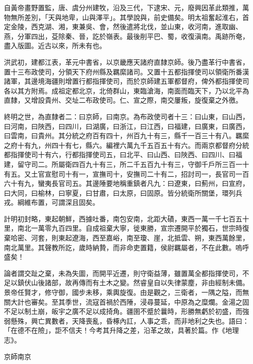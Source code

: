 
自黃帝畫野置監，唐、虞分州建牧，沿及三代，下逮宋、元，廢興因革此類推，萬物無所差別，「天與地卑，山與澤平」。其學說與，前史備矣。明太祖奮起淮右，首定金陵，西克湖、湘，東兼吳、會，然後遣將北伐，並山東，收河南，進取幽、燕，分軍四出，芟除秦、晉，訖於嶺表。最後削平巴、蜀，收復滇南。禹跡所奄，盡入版圖。近古以來，所未有也。

洪武初，建都江表，革元中書省，以京畿應天諸府直隸京師。後乃盡革行中書省，置十三布政使司，分領天下府州縣及羈縻諸司。又置十五都指揮使司以領衛所番漢諸軍，其邊境海疆則增置行都指揮使司，而於京師建五軍都督府，俾外都指揮使司各以其方附焉。成祖定都北京，北倚群山，東臨滄海，南面而臨天下，乃以北平為直隸，又增設貴州、交址二布政使司。仁、宣之際，南交屢叛，旋復棄之外徼。

終明之世，為直隸者二：曰京師，曰南京。為布政使司者十三：曰山東，曰山西，曰河南，曰陜西，曰四川，曰湖廣，曰浙江，曰江西，曰福建，曰廣東，曰廣西，曰雲南，曰貴州。其分統之府百有四十，州百九十有三，縣千一百三十有八。羈縻之府十有九，州四十有七，縣六。編裡六萬九千五百五十有六。而兩京都督府分統都指揮使司十有六，行都指揮使司五，曰北平、曰山西、曰陜西、曰四川、曰福建，留守司二。所屬衛四百九十有三，所二千五百九十有三，守御千戶所三百一十有五。又土官宣慰司十有一，宣撫司十，安撫司二十有二，招討司一，長官司一百六十有九，蠻夷長官司五。其邊陲要地稱重鎮者凡九：曰遼東，曰薊州，曰宣府，曰大同，曰榆林，曰寧夏，曰甘肅，曰太原，曰固原。皆分統衛所關堡，環列兵戎。綱維布置，可謂深且固矣。

計明初封略，東起朝鮮，西據吐番，南包安南，北距大磧，東西一萬一千七百五十里，南北一萬零九百四里。自成祖棄大寧，徙東勝，宣宗遷開平於獨石，世宗時復棄哈密、河套，則東起遼海，西至嘉峪，南至瓊、崖，北抵雲、朔，東西萬餘里，南北萬里。其聲教所訖，歲時納贄，而非命吏置籍，侯尉羈屬者，不在此數。嗚呼盛矣！

論者謂交趾之棄，未為失圖，而開平近遷，則守衛益薄，雖置萬全都指揮使司，不足以鎮伏山後諸部，故再傳而有土木之變。然睿皇自以失律蒙塵，非由經制未備。景帝任賢才，修守御，國步未移，乘輿旋復。由是觀之，三衛者，一隅之隘，而無關大計也審矣。至其季世，流寇首禍於西陲，浸尋蔓延，中原為之糜爛。金湯之固不足以制土崩，皈宇之廣不足以成掎角。疆圉不蹙於曩時，形勝無虧於初盛，而強弱懸殊，興亡異數者，天降喪亂，昏椓內訌，人事之乖，而非地利之失也。語曰：「在德不在險」，詎不信夫！今考其升降之差，沿革之故，具著於篇。作《地理志》。

京師南京

